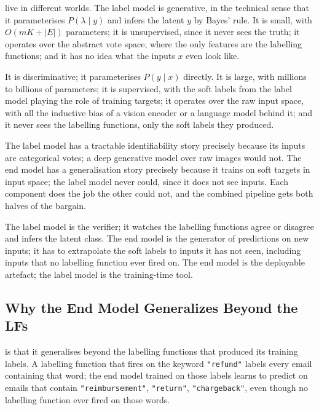  live in different worlds. The label model is generative, in the technical sense that it parameterises $P(\lambda \mid y)$ and infers the latent $y$ by Bayes' rule. It is small, with $O(mK + |E|)$ parameters; it is unsupervised, since it never sees the truth; it operates over the abstract vote space, where the only features are the labelling functions; and it has no idea what the inputs $x$ even look like.

 It is discriminative; it parameterises $P(y \mid x)$ directly. It is large, with millions to billions of parameters; it is supervised, with the soft labels from the label model playing the role of training targets; it operates over the raw input space, with all the inductive bias of a vision encoder or a language model behind it; and it never sees the labelling functions, only the soft labels they produced.

 The label model has a tractable identifiability story precisely because its inputs are categorical votes; a deep generative model over raw images would not. The end model has a generalisation story precisely because it trains on soft targets in input space; the label model never could, since it does not see inputs. Each component does the job the other could not, and the combined pipeline gets both halves of the bargain.

 The label model is the verifier; it watches the labelling functions agree or disagree and infers the latent class. The end model is the generator of predictions on new inputs; it has to extrapolate the soft labels to inputs it has not seen, including inputs that no labelling function ever fired on. The end model is the deployable artefact; the label model is the training-time tool.

\subsection{Why the End Model Generalizes Beyond the LFs}


 is that it generalises beyond the labelling functions that produced its training labels. A labelling function that fires on the keyword \verb|"refund"| labels every email containing that word; the end model trained on those labels learns to predict on emails that contain \verb|"reimbursement"|, \verb|"return"|, \verb|"chargeback"|, even though no labelling function ever fired on those words.


